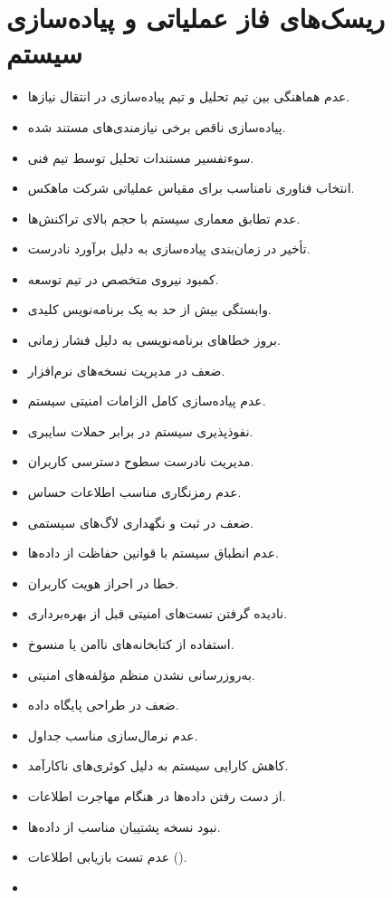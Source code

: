 \documentclass[12pt,a4paper]{report}
\begin{document}
\section{ریسک‌های فاز عملیاتی و پیاده‌سازی سیستم}
\begin{itemize}
\item 
عدم هماهنگی بین تیم تحلیل و تیم پیاده‌سازی در انتقال نیازها.
\item 
پیاده‌سازی ناقص برخی نیازمندی‌های مستند شده.
\item 
سوءتفسیر مستندات تحلیل توسط تیم فنی.
\item 
انتخاب فناوری نامناسب برای مقیاس عملیاتی شرکت ماهکس.
\item 
عدم تطابق معماری سیستم با حجم بالای تراکنش‌ها.
\item 
تأخیر در زمان‌بندی پیاده‌سازی به دلیل برآورد نادرست.
\item 
کمبود نیروی متخصص در تیم توسعه.
\item 
وابستگی بیش از حد به یک برنامه‌نویس کلیدی.
\item 
بروز خطاهای برنامه‌نویسی به دلیل فشار زمانی.
\item 
ضعف در مدیریت نسخه‌های نرم‌افزار.
\item 
عدم پیاده‌سازی کامل الزامات امنیتی سیستم.
\item 
نفوذپذیری سیستم در برابر حملات سایبری.
\item 
مدیریت نادرست سطوح دسترسی کاربران.
\item 
عدم رمزنگاری مناسب اطلاعات حساس.
\item 
ضعف در ثبت و نگهداری لاگ‌های سیستمی.
\item 
عدم انطباق سیستم با قوانین حفاظت از داده‌ها.
\item 
خطا در احراز هویت کاربران.
\item 
نادیده گرفتن تست‌های امنیتی قبل از بهره‌برداری.
\item 
استفاده از کتابخانه‌های ناامن یا منسوخ.
\item 
به‌روزرسانی نشدن منظم مؤلفه‌های امنیتی.
\item 
ضعف در طراحی پایگاه داده.
\item 
عدم نرمال‌سازی مناسب جداول.
\item 
کاهش کارایی سیستم به دلیل کوئری‌های ناکارآمد.
\item 
از دست رفتن داده‌ها در هنگام مهاجرت اطلاعات.
\item 
نبود نسخه پشتیبان مناسب از داده‌ها.
\item 
عدم تست بازیابی اطلاعات ().
\item 

\end{itemize}
\end{document}
